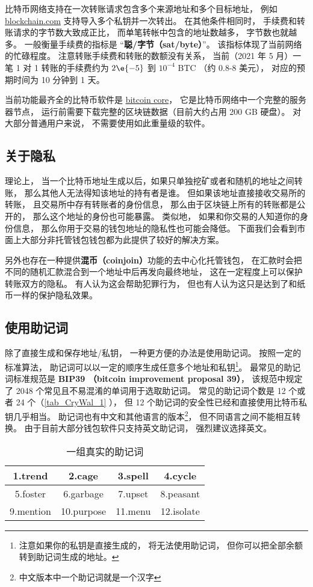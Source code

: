 比特币网络支持在一次转账请求包含多个来源地址和多个目标地址， 例如 \href{https://blockchain.com}{blockchain.com} 支持导入多个私钥并一次转出。 在其他条件相同时， 手续费和转账请求的字节数大致成正比， 而单笔转帐中包含的地址数越多， 字节数也就越多。 一般衡量手续费的指标是 “\textbf{聪/字节（sat/byte）}”。 该指标体现了当前网络的忙碌程度。 注意转账手续费和转账的数额没有关系， 当前（2021 年 5 月）一笔 1 对 1 转账的手续费约为 $2\e{-5}$ 到 $10^{-4}$ BTC （约 0.8-8 美元）， 对应的预期时间为 10 分钟到 1 天。

当前功能最齐全的比特币软件是 \href{https://bitcoin.org/en/bitcoin-core/}{bitcoin core}， 它是比特币网络中一个完整的服务器节点， 运行前需要下载完整的区块链数据（目前大约占用 200 GB 硬盘）。 对大部分普通用户来说， 不需要使用如此重量级的软件。

\subsection{关于隐私}
理论上， 当一个比特币地址生成以后，如果只单独挖矿或者和随机的地址之间转账， 那么其他人无法得知该地址的持有者是谁。 但如果该地址直接接收交易所的转账， 且交易所中存有转账者的身份信息， 那么由于区块链上所有的转账都是公开的， 那么这个地址的身份也可能暴露。 类似地， 如果和你交易的人知道你的身份信息， 那么你用于交易的钱包地址的隐私性也可能会降低。 下面我们会看到市面上大部分非托管钱包钱包都为此提供了较好的解决方案。

另外也存在一种提供\textbf{混币（coinjoin）}功能的去中心化托管钱包， 在汇款时会把不同的随机汇款混合到一个地址中后再发向最终地址， 这在一定程度上可以保护转账双方的隐私。 有人认为这会帮助犯罪行为， 但也有人认为这只是达到了和纸币一样的保护隐私效果。

\subsection{使用助记词}
除了直接生成和保存地址/私钥， 一种更方便的办法是使用助记词。 按照一定的标准算法， 助记词可以以一定的顺序生成任意多个地址和私钥\footnote{注意如果你的私钥是直接生成的， 将无法使用助记词， 但你可以把全部余额转到助记词生成的地址。}。 最常见的助记词标准规范是 \textbf{BIP39 （bitcoin improvement proposal 39）}， 该规范中规定了 2048 个常见且不易混淆的单词用于选取助记词。 常见的助记词个数是 12 个或者 24 个（\autoref{tab_CryWal_1} ）， 但 12 个助记词的安全性已经和直接使用比特币私钥几乎相当。 助记词也有中文和其他语言的版本\footnote{中文版本中一个助记词就是一个汉字}， 但不同语言之间不能相互转换。 由于目前大部分钱包软件只支持英文助记词， 强烈建议选择英文。
\begin{table}[ht]
\centering
\caption{一组真实的助记词}\label{tab_CryWal_1}
\begin{tabular}{|c|c|c|c|}
\hline
1.trend & 2.cage & 3.spell & 4.cycle \\
\hline
5.foster & 6.garbage & 7.upset & 8.peasant \\
\hline
9.mention & 10.purpose & 11.menu & 12.isolate \\
\hline
\end{tabular}
\end{table}

